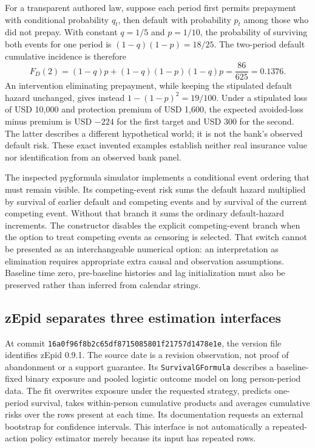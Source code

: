 For a transparent authored law, suppose each period first permits prepayment
with conditional probability $q_t$, then default with probability $p_t$ among
those who did not prepay. With constant $q=1/5$ and $p=1/10$, the probability
of surviving both events for one period is $(1-q)(1-p)=18/25$. The two-period
default cumulative incidence is therefore
\[
 F_D(2)=(1-q)p+(1-q)(1-p)(1-q)p
       =\frac{86}{625}=0.1376.
\]
An intervention eliminating prepayment, while keeping the stipulated default
hazard unchanged, gives instead $1-(1-p)^2=19/100$. Under a stipulated loss
of USD 10,000 and protection premium of USD 1,600, the expected avoided-loss
minus premium is USD $-224$ for the first target and USD 300 for the second.
The latter describes a different hypothetical world; it is not the bank's
observed default risk. These exact invented examples establish neither real
insurance value nor identification from an observed bank panel.
\citep{exec24_longpy_reference}

The inspected pygformula simulator implements a conditional event ordering
that must remain visible. Its competing-event risk sums the default hazard
multiplied by survival of earlier default and competing events and by
survival of the current competing event. Without that branch it sums the
ordinary default-hazard increments. The constructor disables the explicit
competing-event branch when the option to treat competing events as censoring
is selected. That switch cannot be presented as an interchangeable numerical
option: an interpretation as elimination requires appropriate extra causal
and observation assumptions. Baseline time zero, pre-baseline histories and
lag initialization must also be preserved rather than inferred from calendar
strings.~\citep{exec24_longpy_pygformula_source}

\subsection{zEpid separates three estimation interfaces}
At commit \texttt{16a0f96f8b2c65df8715085801f21757d1478e1e}, the version file
identifies zEpid 0.9.1. The source date is a revision observation, not proof
of abandonment or a support guarantee. Its \texttt{SurvivalGFormula} describes
a baseline-fixed binary exposure and pooled logistic outcome model on long
person-period data. The fit overwrites exposure under the requested strategy,
predicts one-period survival, takes within-person cumulative products and
averages cumulative risks over the rows present at each time. Its documentation
requests an external bootstrap for confidence intervals. This interface is
not automatically a repeated-action policy estimator merely because its
input has repeated rows.~\citep{exec24_longpy_zepid_source}

